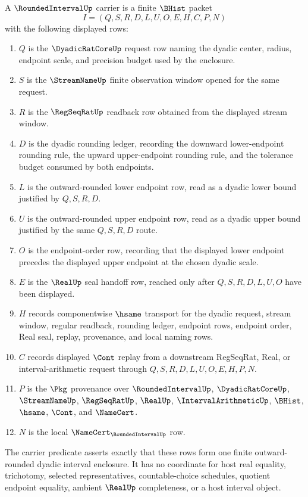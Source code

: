 \begin{definition}
\label{def:rounded-interval-carrier}
A $\RoundedIntervalUp$ carrier is a finite $\BHist$ packet
$$
I=(Q,S,R,D,L,U,O,E,H,C,P,N)
$$
with the following displayed rows:
\begin{enumerate}
\item $Q$ is the $\DyadicRatCoreUp$ request row naming the dyadic center, radius, endpoint scale, and precision budget used by the enclosure.
\item $S$ is the $\StreamNameUp$ finite observation window opened for the same request.
\item $R$ is the $\RegSeqRatUp$ readback row obtained from the displayed stream window.
\item $D$ is the dyadic rounding ledger, recording the downward lower-endpoint rounding rule, the upward upper-endpoint rounding rule, and the tolerance budget consumed by both endpoints.
\item $L$ is the outward-rounded lower endpoint row, read as a dyadic lower bound justified by $Q,S,R,D$.
\item $U$ is the outward-rounded upper endpoint row, read as a dyadic upper bound justified by the same $Q,S,R,D$ route.
\item $O$ is the endpoint-order row, recording that the displayed lower endpoint precedes the displayed upper endpoint at the chosen dyadic scale.
\item $E$ is the $\RealUp$ seal handoff row, reached only after $Q,S,R,D,L,U,O$ have been displayed.
\item $H$ records componentwise $\hsame$ transport for the dyadic request, stream window, regular readback, rounding ledger, endpoint rows, endpoint order, Real seal, replay, provenance, and local naming rows.
\item $C$ records displayed $\Cont$ replay from a downstream RegSeqRat, Real, or interval-arithmetic request through $Q,S,R,D,L,U,O,E,H,P,N$.
\item $P$ is the $\Pkg$ provenance over $\RoundedIntervalUp$, $\DyadicRatCoreUp$, $\StreamNameUp$, $\RegSeqRatUp$, $\RealUp$, $\IntervalArithmeticUp$, $\BHist$, $\hsame$, $\Cont$, and $\NameCert$.
\item $N$ is the local $\NameCert_{\RoundedIntervalUp}$ row.
\end{enumerate}
The carrier predicate asserts exactly that these rows form one finite outward-rounded dyadic interval enclosure. It has no coordinate for host real equality, trichotomy, selected representatives, countable-choice schedules, quotient endpoint equality, ambient $\RealUp$ completeness, or a host interval object.
\end{definition}

